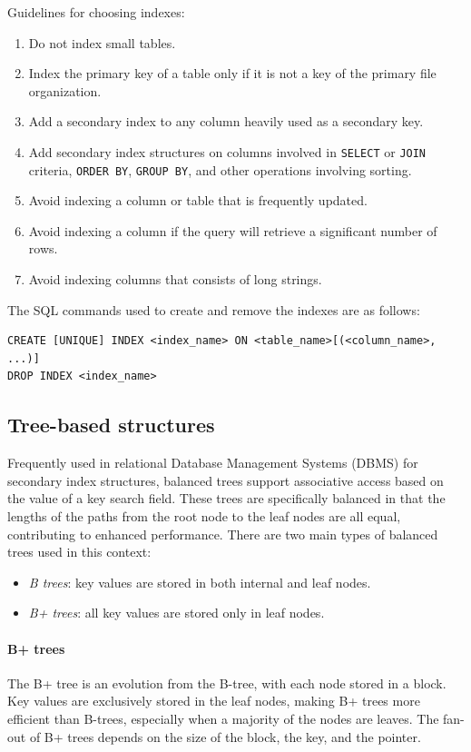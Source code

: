 Guidelines for choosing indexes:
\begin{enumerate}
  \item Do not index small tables. 
  \item Index the primary key of a table only if it is not a key of the primary file organization.
  \item Add a secondary index to any column heavily used as a secondary key.
  \item Add secondary index structures on columns involved in \texttt{SELECT} or \texttt{JOIN} criteria, \texttt{ORDER BY}, \texttt{GROUP BY}, and other operations involving sorting.
  \item Avoid indexing a column or table that is frequently updated.
  \item Avoid indexing a column if the query will retrieve a significant number of rows.
  \item Avoid indexing columns that consists of long strings.
\end{enumerate}

The SQL commands used to create and remove the indexes are as follows: 
\begin{lstlisting}[style=SQL]
CREATE [UNIQUE] INDEX <index_name> ON <table_name>[(<column_name>, ...)]
DROP INDEX <index_name>
\end{lstlisting}

\subsection{Tree-based structures}
Frequently used in relational Database Management Systems (DBMS) for secondary index structures, balanced trees support associative access based on the value of a key search field.
These trees are specifically balanced in that the lengths of the paths from the root node to the leaf nodes are all equal, contributing to enhanced performance. 
There are two main types of balanced trees used in this context:
\begin{itemize}
    \item \textit{B trees}: key values are stored in both internal and leaf nodes.
    \item \textit{B+ trees}: all key values are stored only in leaf nodes.
\end{itemize}

\paragraph*{B+ trees}
The B+ tree is an evolution from the B-tree, with each node stored in a block. 
Key values are exclusively stored in the leaf nodes, making B+ trees more efficient than B-trees, especially when a majority of the nodes are leaves. 
The fan-out of B+ trees depends on the size of the block, the key, and the pointer.

